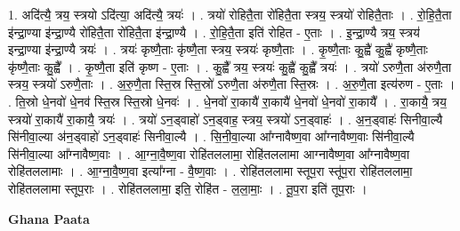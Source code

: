 \documentclass[17pt]{extarticle}
\begin{document}
1. अदि॑त्यै॒ त्रय॒ स्त्रयो ऽदि॑त्या॒ अदि॑त्यै॒ त्रयः॑ । . त्रयो॑ रोहितै॒ता रो॑हितै॒ता स्त्रय॒ स्त्रयो॑ रोहितै॒ताः । . रो॒हि॒तै॒ता इ॑न्द्रा॒ण्या इ॑न्द्रा॒ण्यै रो॑हितै॒ता रो॑हितै॒ता इ॑न्द्रा॒ण्यै । . रो॒हि॒तै॒ता इति॑ रोहित - ए॒ताः । . इ॒न्द्रा॒ण्यै त्रय॒ स्त्रय॑ इन्द्रा॒ण्या इ॑न्द्रा॒ण्यै त्रयः॑ । . त्रयः॑ कृष्णै॒ताः कृ॑ष्णै॒ता स्त्रय॒ स्त्रयः॑ कृष्णै॒ताः । . कृ॒ष्णै॒ताः कु॒ह्वै॑ कु॒ह्वै॑ कृष्णै॒ताः कृ॑ष्णै॒ताः कु॒ह्वै᳚ । . कृ॒ष्णै॒ता इति॑ कृष्ण - ए॒ताः । . कु॒ह्वै᳚ त्रय॒ स्त्रयः॑ कु॒ह्वै॑ कु॒ह्वै᳚ त्रयः॑ । . त्रयो॑ ऽरुणै॒ता अ॑रुणै॒ता स्त्रय॒ स्त्रयो॑ ऽरुणै॒ताः । . अ॒रु॒णै॒ता स्ति॒स्र स्ति॒स्रो॑ ऽरुणै॒ता अ॑रुणै॒ता स्ति॒स्रः । . अ॒रु॒णै॒ता इत्य॑रुण - ए॒ताः । . ति॒स्रो धे॒नवो॑ धे॒नव॑ स्ति॒स्र स्ति॒स्रो धे॒नवः॑ । . धे॒नवो॑ रा॒कायै॑ रा॒कायै॑ धे॒नवो॑ धे॒नवो॑ रा॒कायै᳚ । . रा॒कायै॒ त्रय॒ स्त्रयो॑ रा॒कायै॑ रा॒कायै॒ त्रयः॑ । . त्रयो॑ ऽन॒ड्वाहो॑ ऽन॒ड्वाह॒ स्त्रय॒ स्त्रयो॑ ऽन॒ड्वाहः॑ । . अ॒न॒ड्वाहः॑ सिनीवा॒ल्यै सि॑नीवा॒ल्या अ॑न॒ड्वाहो॑ ऽन॒ड्वाहः॑ सिनीवा॒ल्यै । . सि॒नी॒वा॒ल्या आ᳚ग्नावैष्ण॒वा आ᳚ग्नावैष्ण॒वाः सि॑नीवा॒ल्यै सि॑नीवा॒ल्या आ᳚ग्नावैष्ण॒वाः । . आ॒ग्ना॒वै॒ष्ण॒वा रोहि॑तललामा॒ रोहि॑तललामा आग्नावैष्ण॒वा आ᳚ग्नावैष्ण॒वा रोहि॑तललामाः । . आ॒ग्ना॒वै॒ष्ण॒वा इत्या᳚ग्ना - वै॒ष्ण॒वाः । . रोहि॑तललामा स्तूप॒रा स्तू॑प॒रा रोहि॑तललामा॒ रोहि॑तललामा स्तूप॒राः । . रोहि॑तललामा॒ इति॒ रोहि॑त - ल॒ला॒माः॒ । . तू॒प॒रा इति॑ तूप॒राः । \newline

\textbf{Ghana Paata } \newline
\end{document}
